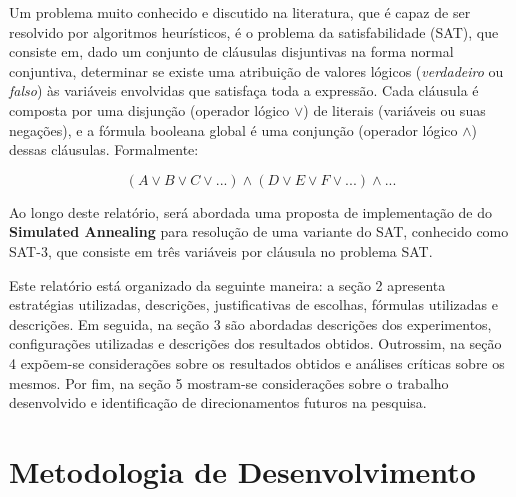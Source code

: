 \documentclass[12pt]{article}
\begin{document}
Um problema muito conhecido e discutido na literatura, que é capaz de ser resolvido por algoritmos heurísticos, é o problema da satisfabilidade (SAT), que consiste em, dado um conjunto de cláusulas disjuntivas na forma normal conjuntiva, determinar se existe uma atribuição de valores lógicos (\textit{verdadeiro} ou \textit{falso}) às variáveis envolvidas que satisfaça toda a expressão.
%
Cada cláusula é composta por uma disjunção (operador lógico $\lor$) de literais (variáveis ou suas negações), e a fórmula booleana global é uma conjunção (operador lógico $\land$) dessas cláusulas. Formalmente:

\begin{equation}
(A \lor B \lor C \lor ...) \land (D \lor E \lor F \lor ...) \land ...
\end{equation}

Ao longo deste relatório, será abordada uma proposta de implementação de do \textbf{Simulated Annealing} para resolução de uma variante do SAT, conhecido como SAT-3, que consiste em três variáveis por cláusula no problema SAT.

Este relatório está organizado da seguinte maneira: a seção 2 apresenta estratégias utilizadas, descrições, justificativas de escolhas, fórmulas utilizadas e descrições. Em seguida, na seção 3 são abordadas descrições dos experimentos, configurações utilizadas e descrições dos resultados obtidos. Outrossim, na seção 4 expõem-se considerações sobre os resultados obtidos e análises críticas sobre os mesmos. Por fim, na seção 5 mostram-se considerações sobre o trabalho desenvolvido e identificação de direcionamentos futuros na pesquisa.



\section{Metodologia de Desenvolvimento}
\label{sec:metodologia_de_desenvolvimento}
\end{document}
